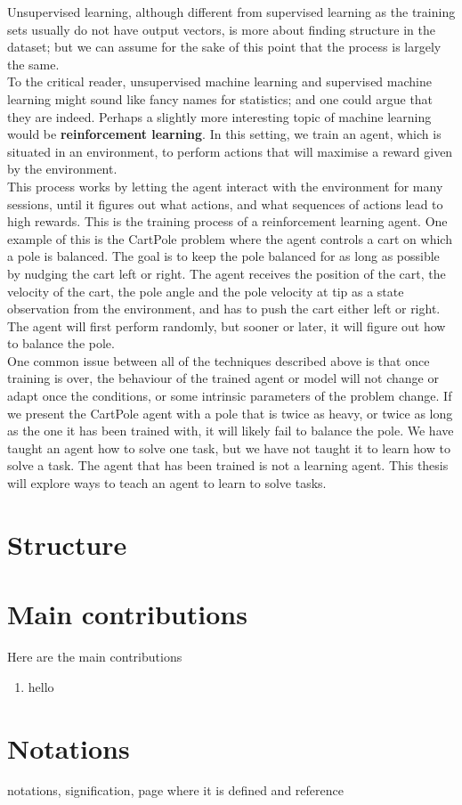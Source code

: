 Unsupervised learning, although different from supervised learning as the
training sets usually do not have output vectors, is more about finding
structure in the dataset; but we can assume for the sake of this point that
the process is largely the same.\\

To the critical reader, unsupervised machine learning and supervised machine
learning might sound like fancy names for statistics; and one could argue that
they are indeed. Perhaps a slightly more interesting topic of machine learning
would be \textbf{reinforcement learning}. In this setting, we train an agent, 
which is situated in an environment, to perform actions that will maximise
a reward given by the environment.\\

This process works by letting the agent interact with the environment for many
sessions, until it figures out what actions, and what sequences of actions lead
to high rewards. This is the training process of a reinforcement learning agent.
One example of this is the CartPole problem \cite{barto-cartpole} where the
agent controls a cart on which a pole is balanced. The goal is to keep the
pole balanced for as long as possible by nudging the cart left or right. The
agent receives the position of the cart, the velocity of the cart, the pole
angle and the pole velocity at tip as a state observation from the environment,
and has to push the cart either left or right. The agent will first perform
randomly, but sooner or later, it will figure out how to balance the pole.\\

One common issue between all of the techniques described above is that once
training is over, the behaviour of the trained agent or model will not change
or adapt once the conditions, or some intrinsic parameters of the problem
change. If we present the CartPole agent with a pole that is twice as heavy,
or twice as long as the one it has been trained with, it will likely fail to 
balance the pole. We have taught an agent how to solve one task, but we have
not taught it to learn how to solve a task. The agent that has been trained is
not a learning agent. This thesis will explore ways to teach an agent to learn
to solve tasks.



\section{Structure}


\section{Main contributions}
\noindent
Here are the main contributions
\vspace{1cm}
\begin{enumerate}
    \item hello
\end{enumerate}

\clearpage
\section{Notations}

%
notations, signification, page where it is defined and reference
\
